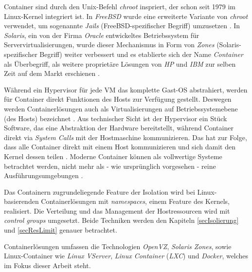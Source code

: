 \documentclass[../main.tex]{subfiles}
\begin{document}
      Container sind durch den Unix-Befehl \emph{chroot}\cite{chroot} inspriert, der schon seit 1979 im Linux-Kernel integriert ist. In \emph{FreeBSD} wurde eine erweiterte Variante von \emph{chroot} verwendet, um sogenannte \emph{Jails} (FreeBSD-spezifischer Begriff) umzusetzen \cite{jails}. In \emph{Solaris}, ein von der Firma \emph{Oracle} entwickeltes Betriebssystem für Servervirtualisierungen\cite{solaris}, wurde dieser Mechanismus in Form von \emph{Zones} (Solaris-spezifischer Begriff) \cite{zones} weiter verbessert und es etablierte sich der Name \emph{Container} als Überbegriff, als weitere proprietäre Lösungen von \emph{HP} und \emph{IBM} zur selben Zeit auf dem Markt erschienen \cite[S.2]{dockerLXCKub}.

      Während ein Hypervisor für jede \acrshort{VM} das komplette Gast-\acrshort{OS} abstrahiert, werden für Container direkt Funktionen des Hosts zur Verfügung gestellt. Deswegen werden Containerlösungen auch als Virtualisierungen auf Betriebssystemebene (des Hosts) bezeichnet \cite[S.6]{dockerBook}\cite[S.2]{containerVirtPerformance}. Aus technischer Sicht ist der Hypervisor ein Stück Software, das eine Abstraktion der Hardware bereitstellt, während Container direkt via \emph{System Calls} mit der Hostmaschine kommunizieren. Das hat zur Folge, dass alle Container direkt mit einem Host kommunizieren und sich damit den Kernel dessen teilen \cite[S.2]{containerVirtPerformance}\cite[S.3]{dockerLXCKub}. Moderne Container können als vollwertige Systeme betrachtet werden, nicht mehr als - wie ursprünglich vorgesehen - reine Ausführungsumgebungen \cite[S.7]{dockerBook}.

      Das Containern zugrundeliegende Feature der Isolation wird bei Linux-basierenden Containerlösungen mit \emph{namespaces}, einem Feature des Kernels, realisiert. Die Verteilung und das Management der Hostressourcen wird mit \emph{control groups} umgesetzt. Beide Techniken werden den Kapiteln \ref{secIsolierung} und \ref{secResLimit} genauer betrachtet.


      Containerlösungen umfassen die Technologien \emph{OpenVZ}, \emph{Solaris Zones}, sowie Linux-Container wie \emph{Linux VServer}, \emph{Linux Container} (\emph{LXC}) \cite[S.7]{dockerBook}\cite[S.1]{containerVirtPerformance} und \emph{Docker}, welches im Fokus dieser Arbeit steht.
\end{document}
